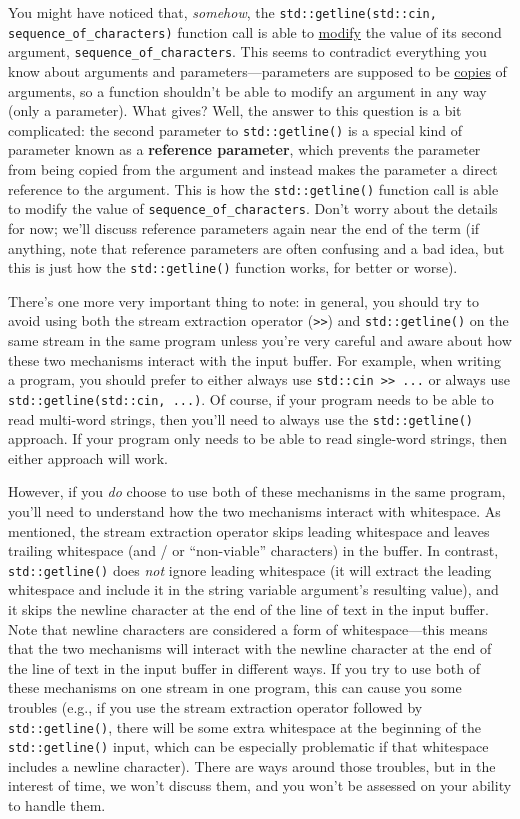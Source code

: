 \documentclass{article}
\begin{document}
You might have noticed that, \textit{somehow}, the \texttt{std::getline(std::cin, sequence\_of\_characters)} function call is able to \ul{modify} the value of its second argument, \texttt{sequence\_of\_characters}. This seems to contradict everything you know about arguments and parameters---parameters are supposed to be \ul{copies} of arguments, so a function shouldn't be able to modify an argument in any way (only a parameter). What gives? Well, the answer to this question is a bit complicated: the second parameter to \texttt{std::getline()} is a special kind of parameter known as a \textbf{reference parameter}, which prevents the parameter from being copied from the argument and instead makes the parameter a direct reference to the argument. This is how the \texttt{std::getline()} function call is able to modify the value of \texttt{sequence\_of\_characters}. Don't worry about the details for now; we'll discuss reference parameters again near the end of the term (if anything, note that reference parameters are often confusing and a bad idea, but this is just how the \texttt{std::getline()} function works, for better or worse).

There's one more very important thing to note: in general, you should try to avoid using both the stream extraction operator (\texttt{>>}) and \texttt{std::getline()} on the same stream in the same program unless you're very careful and aware about how these two mechanisms interact with the input buffer. For example, when writing a program, you should prefer to either always use \texttt{std::cin >> ...} or always use \texttt{std::getline(std::cin, ...)}. Of course, if your program needs to be able to read multi-word strings, then you'll need to always use the \texttt{std::getline()} approach. If your program only needs to be able to read single-word strings, then either approach will work.

However, if you \textit{do} choose to use both of these mechanisms in the same program, you'll need to understand how the two mechanisms interact with whitespace. As mentioned, the stream extraction operator skips leading whitespace and leaves trailing whitespace (and / or ``non-viable'' characters) in the buffer. In contrast, \texttt{std::getline()} does \textit{not} ignore leading whitespace (it will extract the leading whitespace and include it in the string variable argument's resulting value), and it skips the newline character at the end of the line of text in the input buffer. Note that newline characters are considered a form of whitespace---this means that the two mechanisms will interact with the newline character at the end of the line of text in the input buffer in different ways. If you try to use both of these mechanisms on one stream in one program, this can cause you some troubles (e.g., if you use the stream extraction operator followed by \texttt{std::getline()}, there will be some extra whitespace at the beginning of the \texttt{std::getline()} input, which can be especially problematic if that whitespace includes a newline character). There are ways around those troubles, but in the interest of time, we won't discuss them, and you won't be assessed on your ability to handle them.
\end{document}
